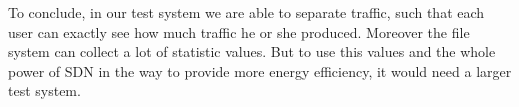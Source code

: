 To conclude, in our test system we are able to separate traffic, such that each user can exactly see how much traffic he or she produced. Moreover the file system can collect a lot of statistic values. But to use this values and the whole power of SDN in the way to provide more energy efficiency, it would need a larger test system.  

